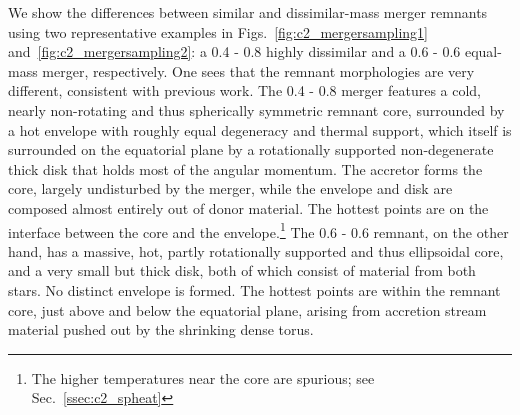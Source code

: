 We show the differences between similar and dissimilar-mass merger remnants using two representative examples in Figs.~\ref{fig:c2_mergersampling1} and~\ref{fig:c2_mergersampling2}: a 0.4 - 0.8 {\Msun} highly dissimilar and a 0.6 - 0.6 {\Msun} equal-mass merger, respectively.  One sees that the remnant morphologies are very different, consistent with previous work.  The 0.4 - 0.8 {\Msun} merger features a cold, nearly non-rotating and thus spherically symmetric remnant core, surrounded by a hot envelope with roughly equal degeneracy and thermal support, which itself is surrounded on the equatorial plane by a rotationally supported non-degenerate thick disk that holds most of the angular momentum.  The accretor forms the core, largely undisturbed by the merger, while the envelope and disk are composed almost entirely out of donor material.  The hottest points are on the interface between the core and the envelope.\footnote{The higher temperatures near the core are spurious; see Sec.~\ref{ssec:c2_spheat}}  The 0.6 - 0.6 {\Msun} remnant, on the other hand, has a massive, hot, partly rotationally supported and thus ellipsoidal core, and a very small but thick disk, both of which consist of material from both stars.  No distinct envelope is formed.  The hottest points are within the remnant core, just above and below the equatorial plane, arising from accretion stream material pushed out by the shrinking dense torus.




